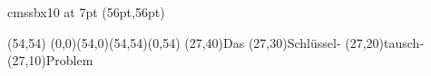 

\font\myfont cmssbx10 at 7pt
\PapierGroesse(56pt,56pt)




\begin{psfigur}(54,54)
\psPolygon[fuellfarbe=0.753,eckradius=5,linienstil=](0,0)(54,0)(54,54)(0,54)
\psNeueSchicht
\rpin(27,40){\myfont Das}
\rpin(27,30){\myfont Schl\"ussel-}
\rpin(27,20){\myfont tausch-}
\rpin(27,10){\myfont Problem}
\end{psfigur}
 
